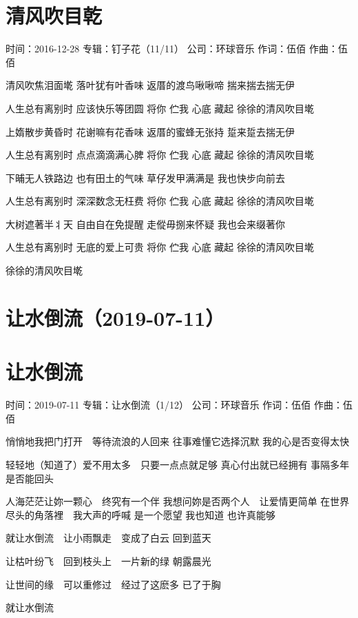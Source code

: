 \documentclass[UTF8,a4paper,oneside,twocolumn,12pt]{ctexbook}
\newcommand{\infopair}[2]{\textbullet #1：#2}
\newcommand{\zc}[1][伍佰]{\infopair{作词}{#1}}
\newcommand{\zq}[1][伍佰]{\infopair{作曲}{#1}}
\newcommand{\zj}[1]{\infopair{专辑}{#1}}
\newcommand{\sj}[1]{\infopair{时间}{#1}}
\newcommand{\gs}[1]{\infopair{公司}{#1}}
\newenvironment{info}{\begin{flushleft}\kaishu
	}
	{\end{flushleft}\normalsize\yahei\par}
\newenvironment{lyric}{
	}
{}
\begin{document}
\section{清风吹目乾}
\begin{info}
	\sj{2016-12-28}
	\zj{钉子花（11/11）}
	\gs{环球音乐}
	\zc
	\zq
\end{info}
\begin{lyric}
	清风吹焦泪面墘
	落叶犹有叶香味
	返厝的渡鸟啾啾啼
	揣来揣去揣无伊

	人生总有离别时
	应该快乐等团圆
	将你 伫我 心底 藏起
	徐徐的清风吹目墘

	上媠散步黄昏时
	花谢嘛有花香味
	返厝的蜜蜂无张持
	踅来踅去揣无伊

	人生总有离别时
	点点滴滴满心脾
	将你 伫我 心底 藏起
	徐徐的清风吹目墘

	下晡无人铁路边
	也有田土的气味
	草仔发甲满满是
	我也快步向前去

	人生总有离别时
	深深数念无枉费
	将你 伫我 心底 藏起
	徐徐的清风吹目墘

	大树遮著半丬天
	自由自在免提醒
	走傱毋捌来怀疑
	我也会来缀著你

	人生总有离别时
	无底的爱上可贵
	将你 伫我 心底 藏起
	徐徐的清风吹目墘

	徐徐的清风吹目墘
\end{lyric}

\section*{让水倒流（2019-07-11）}
\section{让水倒流}
\begin{info}
	\sj{2019-07-11}
	\zj{让水倒流（1/12）}
	\gs{环球音乐}
	\zc
	\zq
\end{info}
\begin{lyric}
	悄悄地我把门打开　等待流浪的人回来
	往事难懂它选择沉默
	我的心是否变得太快

	轻轻地（知道了）爱不用太多　只要一点点就足够
	真心付出就已经拥有
	事隔多年是否能回头

	人海茫茫让妳一颗心　终究有一个伴
	我想问妳是否两个人　让爱情更简单
	在世界尽头的角落裡　我大声的呼喊
	是一个愿望 我也知道 也许真能够

	就让水倒流　让小雨飘走　变成了白云
	回到蓝天

	让枯叶纷飞　回到枝头上　一片新的绿
	朝露晨光

	让世间的缘　可以重修过　经过了这麽多
	已了于胸

	就让水倒流
\end{lyric}
\end{document}
